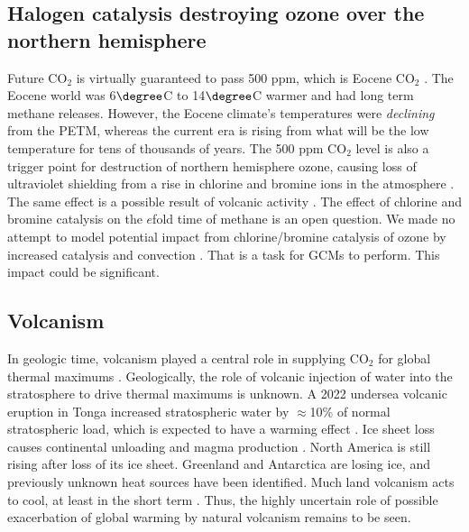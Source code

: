 \documentclass{article}
\begin{document}
\subsection{Halogen catalysis destroying ozone over the northern hemisphere}
Future CO$_2$ is virtually guaranteed to pass 500 ppm, which is Eocene CO$_2$ \cite{Burke2018Plio}. The Eocene world was 6$\degree$C to 14$\degree$C warmer and had long term methane releases. However, the Eocene climate's temperatures were \emph{declining} from the PETM, whereas the current era is rising from what will be the low temperature for tens of thousands of years. The 500 ppm CO$_2$ level is also a trigger point for destruction of northern hemisphere ozone, causing loss of ultraviolet shielding from a rise in chlorine and bromine ions in the atmosphere \cite{Anderson2017ChlorineBromineCatalysis}. The same effect is a possible result of volcanic activity \cite{StauntonSykes2021HalogensRadiativeForcing}. The effect of chlorine and bromine catalysis on the $e$fold time of methane is an open question. We made no attempt to model potential impact from chlorine/bromine catalysis of ozone by increased catalysis and convection \cite{Anderson2017ChlorineBromineCatalysis}. That is a task for GCMs to perform. This impact could be significant. 

\subsection{Volcanism}
In geologic time, volcanism played a central role in supplying CO$_2$ for global thermal maximums \cite{Hochuli2016,Li2021a,Li2021b,Tong_Du2022103878,IEA2022CO2Emissions2021}. Geologically, the role of volcanic injection of water into the stratosphere to drive thermal maximums is unknown. A 2022 undersea volcanic eruption in Tonga increased stratospheric water by $\approx$10\% of normal stratospheric load, which is expected to have a warming effect \cite{Millan2022HungaTongaHydrationStratosphere}. Ice sheet loss causes continental unloading and magma production \cite{Sternai2016DeglaciationMagmaUnloading}. North America is still rising after loss of its ice sheet. Greenland and Antarctica are losing ice, and previously unknown heat sources have been identified. Much land volcanism acts to cool, at least in the short term \cite{ZielinskiVolcanism7000BCGISP2}. Thus, the highly uncertain role of possible exacerbation of global warming by natural volcanism remains to be seen. 
\end{document}
